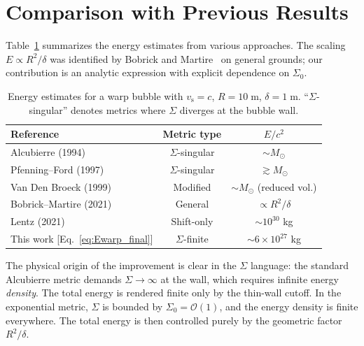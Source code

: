 \documentclass[prd,twocolumn,superscriptaddress,longbibliography]{revtex4-2}
\newcommand{\vs}{v_{\mathrm{s}}}
\begin{document}
\section{Comparison with Previous Results}
\label{sec:comparison}

Table~\ref{tab:comparison} summarizes the energy estimates from
various approaches.  The scaling $E \propto R^2/\delta$ was
identified by Bobrick and Martire~\cite{BobrickMartire2021} on
general grounds; our contribution is an analytic expression with
explicit dependence on $\Sigma_0$.

\begin{table}[t]
\centering
\caption{Energy estimates for a warp bubble with $\vs = c$,
$R = 10\;\mathrm{m}$, $\delta = 1\;\mathrm{m}$.
``$\Sigma$-singular'' denotes metrics where $\Sigma$ diverges
at the bubble wall.}
\label{tab:comparison}
\begin{ruledtabular}
\begin{tabular}{lcc}
Reference & Metric type & $E/c^2$ \\
\hline
Alcubierre (1994)~\cite{Alcubierre1994} & $\Sigma$-singular & $\sim M_\odot$ \\
Pfenning--Ford (1997)~\cite{Pfenning1997} & $\Sigma$-singular & $\gtrsim M_\odot$ \\
Van Den Broeck (1999)~\cite{VanDenBroeck1999} & Modified & $\sim M_\odot$ (reduced vol.)\\
Bobrick--Martire (2021)~\cite{BobrickMartire2021} & General & $\propto R^2/\delta$ \\
Lentz (2021)~\cite{Lentz2021} & Shift-only & $\sim 10^{30}$ kg \\
This work [Eq.~\eqref{eq:Ewarp_final}] & $\Sigma$-finite & $\sim 6\times 10^{27}$ kg \\
\end{tabular}
\end{ruledtabular}
\end{table}

The physical origin of the improvement is clear in the $\Sigma$ language:
the standard Alcubierre metric demands $\Sigma \to \infty$ at the wall,
which requires infinite energy \emph{density}.  The total energy is
rendered finite only by the thin-wall cutoff.  In the exponential metric,
$\Sigma$ is bounded by $\Sigma_0 = \mathcal{O}(1)$, and the energy
density is finite everywhere.  The total energy is then controlled
purely by the geometric factor $R^2/\delta$.
\end{document}
